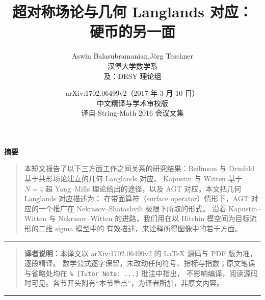 \documentclass[12pt,reqno]{article}
\begin{document}
\title{\bfseries 超对称场论与几何 Langlands 对应：\\[2pt] 硬币的另一面}

\author{Aswin Balasubramanian,\quad J\"org Teschner\\[4pt]
  \normalsize 汉堡大学数学系\\[2pt]
  \normalsize 及：DESY 理论组}

\date{arXiv:1702.06499v2\quad（2017 年 3 月 10 日）\\[4pt]
      \small 中文精译与学术审校版\\[2pt]
      \small 译自 String-Math 2016 会议文集}

\maketitle

\begin{center}
  {\bfseries 摘\quad 要}
\end{center}

\begin{quote}
\small
本短文报告了以下三方面工作之间关系的研究结果：Beilinson 与 Drinfeld 基于共形场论建立的几何 Langlands 对应、
Kapustin 与 Witten 基于 $N=4$ 超 Yang--Mills 理论给出的途径，以及 AGT 对应。本文把几何 Langlands 对应描述为：
在带面算符（surface operator）情形下，AGT 对应的一个推广在 Nekrasov--Shatashvili 极限下所取的形式。
沿着 Kapustin--Witten 与 Nekrasov--Witten 的进路，我们用在以 Hitchin 模空间为目标流形的二维 sigma 模型中的
有效描述，来诠释所得图像中的若干方面。
\end{quote}

\medskip
\noindent\rule{\textwidth}{0.6pt}

\begin{quote}
\small
\textbf{译者说明：}本译文以 arXiv:1702.06499v2 的 \LaTeX{} 源码与 PDF 版为准，逐段精译。
数学公式逐字保留，未改动任何符号、指标与指数；原文笔误与省略处均在 \verb|% [Tutor Note: ...]| 批注中指出，
不影响编译，阅读源码时可见。各节开头附有“本节重点”，为译者所加，非原文内容。
\end{quote}

\noindent\rule{\textwidth}{0.6pt}

\tableofcontents
\newpage
\end{document}

